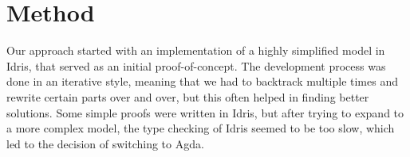 \chapter{Method}

Our approach started with an implementation of a highly simplified model in Idris, that served as an initial proof-of-concept. The development process was done in an iterative style, meaning that we had to backtrack multiple times and rewrite certain parts over and over, but this often helped in finding better solutions. Some simple proofs were written in Idris, but after trying to expand to a more complex model, the type checking of Idris seemed to be too slow, which led to the decision of switching to Agda.

